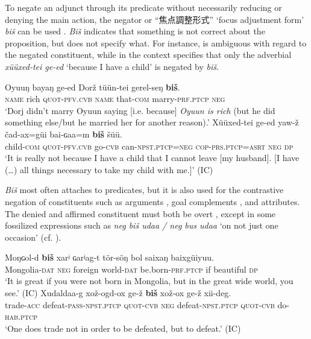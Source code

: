 \documentclass[output=paper,colorlinks,citecolor=brown,chinesefont]{langscibook}
\begin{document}
To negate an adjunct through its predicate without necessarily reducing or denying the main action, the negator or “{\cn 焦点調整形式}” ‘focus adjustment form’ \citep[75--76]{Mukai2001} \textit{biš} can be used \citep[159--160]{Yu1991}. \textit{Biš} indicates that something is not correct about the proposition, but does not specify what. For instance,  is ambiguous with regard to the negated constituent, while in  the context specifies that only the adverbial \textit{xüüxed-tei ge-ed} ‘because I have a child’ is negated by \textit{biš}.

\ea\label{ex:kha:73}
    \gll Oyuuŋ bayaŋ ge-ed Dorž tüün-tei gerel-seŋ \textbf{biš}. \\ 
         \textsc{name} rich \textsc{quot-pfv.cvb} \textsc{name} that-\textsc{com} marry-\textsc{prf.ptcp} \textsc{neg} \\
    \glt ‘Dorj didn’t marry Oyuun saying [i.e. because] \textit{Oyuun is rich} (but he did something else/but he married her for another reason).’ \citep[159--160]{Yu1991}
\z 
\ea\label{ex:kha:74}
    \gll Xüüxed-tei ge-ed yaw-ž čad-ax=güi bai-ɢaa=m \textbf{biš} šüü.\\ 
         child-\textsc{com} \textsc{quot-pfv.cvb} go-\textsc{cvb} can-\textsc{npst.ptcp=neg} \textsc{cop-prs.ptcp=asrt} \textsc{neg} \textsc{dp} \\
    \glt  ‘It is really not because I have a child that I cannot leave [my husband]. [I have (…) all things necessary to take my child with me.]’ (IC)
\z 

\textit{Biš} most often attaches to predicates, but it is also used for the contrastive negation of constituents such as arguments , goal complements , and attributes. The denied and affirmed constituent must both be overt \citep[123--124]{Yu1991}, except in some fossilized expressions such as \textit{neg biš udaa / neg bus udaa} ‘on not just one occasion’ (cf. ).

\ea\label{ex:kha:75}
    \gll Moŋɢol-d \textbf{biš} xarʲ ɢarʲag-t tör-söŋ bol saixaŋ baixgüiyuu. \\ 
         Mongolia-\textsc{dat} \textsc{neg} foreign world-\textsc{dat} be.born-\textsc{prf.ptcp} if beautiful \textsc{dp} \\
    \glt ‘It is great if you were not born in Mongolia, but in the great wide world, you see.’ (IC)
\z 
\ea\label{ex:kha:76}
    \gll Xudaldaa-g xož-ogd-ox   ge-ž \textbf{biš} xož-ox ge-ž xii-deg. \\ 
         trade-\textsc{acc} defeat-\textsc{pass-npst.ptcp} \textsc{quot-cvb} \textsc{neg} defeat-\textsc{npst.ptcp} \textsc{quot-cvb} do-\textsc{hab.ptcp} \\
    \glt ‘One does trade not in order to be defeated, but to defeat.’ (IC)
\z 
\end{document}
